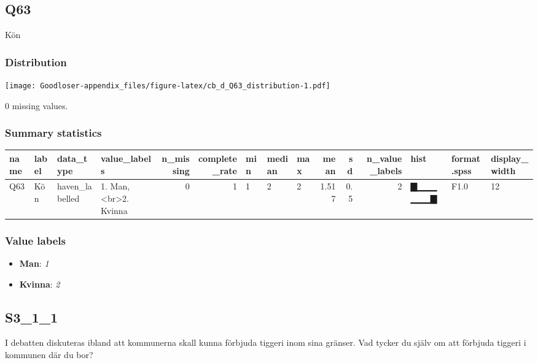 \documentclass[
]{book}
\providecommand{\tightlist}{%
  \setlength{\itemsep}{0pt}\setlength{\parskip}{0pt}}
\begin{document}
\hypertarget{Q63}{%
\subsection{Q63}\label{Q63}}

Kön

\hypertarget{Q63_distribution}{%
\subsubsection{Distribution}\label{Q63_distribution}}

\texttt{[image: Goodloser-appendix\_files/figure-latex/cb\_d\_Q63\_distribution-1.pdf]}

0 missing values.

\hypertarget{Q63_summary}{%
\subsubsection{Summary statistics}\label{Q63_summary}}

\begin{tabular}{l|l|l|l|r|r|l|l|l|r|r|r|l|l|l}
\hline
name & label & data_type & value_labels & n_missing & complete_rate & min & median & max & mean & sd & n_value_labels & hist & format.spss & display_width\\
\hline
Q63 & Kön & haven_labelled & 1. Man,<br>2. Kvinna & 0 & 1 & 1 & 2 & 2 & 1.517 & 0.5 & 2 & ▇▁▁▁▁▁▁▇ & F1.0 & 12\\
\hline
\end{tabular}

\hypertarget{Q63_labels}{%
\subsubsection{Value labels}\label{Q63_labels}}

\begin{itemize}
\tightlist
\item
  \textbf{Man}: \emph{1}
\item
  \textbf{Kvinna}: \emph{2}
\end{itemize}

\hypertarget{S3_1_1}{%
\subsection{S3\_1\_1}\label{S3_1_1}}

I debatten diskuteras ibland att kommunerna skall kunna förbjuda tiggeri inom sina gränser. Vad tycker du själv om att förbjuda tiggeri i kommunen där du bor?
\end{document}
